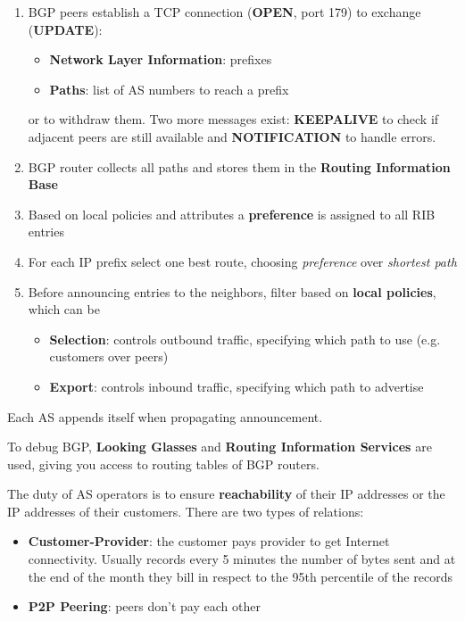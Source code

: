 \begin{enumerate}
	\item BGP peers establish a TCP connection (\textbf{OPEN}, port 179) to exchange (\textbf{UPDATE}):
	\begin{itemize}
		\item \textbf{Network Layer Information}: prefixes
		\item \textbf{Paths}: list of AS numbers to reach a prefix
	\end{itemize}
	or to withdraw them. Two more messages exist: \textbf{KEEPALIVE} to check if adjacent peers are still available and \textbf{NOTIFICATION} to handle errors.
	\item BGP router collects all paths and stores them in the \textbf{Routing Information Base}
	\item Based on local policies and attributes a \textbf{preference} is assigned to all RIB entries
	\item For each IP prefix select one best route, choosing \textit{preference} over \textit{shortest path}
	\item Before announcing entries to the neighbors, filter based on \textbf{local policies}, which can be
	\begin{itemize}
		\item \textbf{Selection}: controls outbound traffic, specifying which path to use (e.g. customers over peers)
		\item \textbf{Export}: controls inbound traffic, specifying which path to advertise
	\end{itemize}
\end{enumerate}

\begin{note}
	Each AS appends itself when propagating announcement.
\end{note}

\begin{note}
	To debug BGP, \textbf{Looking Glasses} and \textbf{Routing Information Services} are used, giving you access to routing tables of BGP routers.
\end{note}

\begin{note}
	The duty of AS operators is to ensure \textbf{reachability} of their IP addresses or the IP addresses of their customers. There are two types of relations:
	\begin{itemize}
		\item \textbf{Customer-Provider}: the customer pays provider to get Internet connectivity. Usually records every 5 minutes the number of bytes sent and at the end of the month they bill in respect to the 95th percentile of the records
		\item \textbf{P2P Peering}: peers don't pay each other
	\end{itemize}
\end{note}

